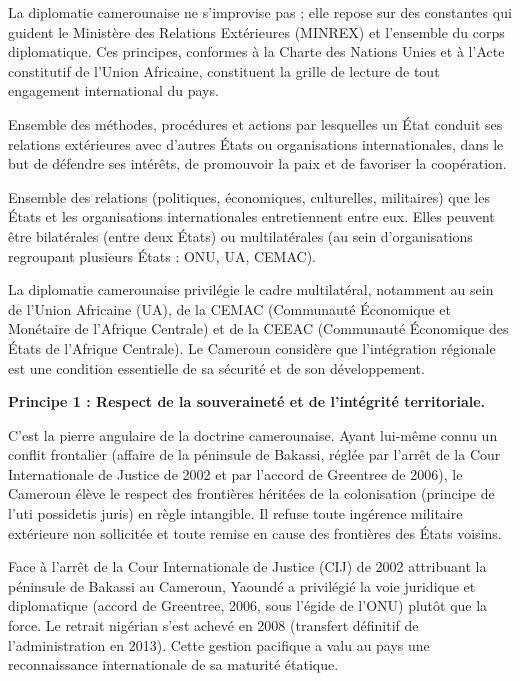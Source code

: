 \documentclass[11pt]{article}
\newcommand{\cle}[1]{{\popxbold\color{popdark}#1}}
\begin{document}
La diplomatie camerounaise ne s'improvise pas ; elle repose sur des constantes qui guident le Ministère des Relations Extérieures (MINREX) et l'ensemble du corps diplomatique. Ces principes, conformes à la Charte des Nations Unies et à l'Acte constitutif de l'Union Africaine, constituent la \cle{grille de lecture} de tout engagement international du pays.

\begin{definition}[Diplomatie]
Ensemble des méthodes, procédures et actions par lesquelles un État conduit ses relations extérieures avec d'autres États ou organisations internationales, dans le but de défendre ses intérêts, de promouvoir la paix et de favoriser la coopération.
\end{definition}

\begin{definition}
Ensemble des relations (politiques, économiques, culturelles, militaires) que les États et les organisations internationales entretiennent entre eux. Elles peuvent être \cle{bilatérales} (entre deux États) ou \cle{multilatérales} (au sein d'organisations regroupant plusieurs États : ONU, UA, CEMAC).
\end{definition}

\begin{propriete}
La diplomatie camerounaise privilégie le cadre multilatéral, notamment au sein de l'Union Africaine (UA), de la CEMAC (Communauté Économique et Monétaire de l'Afrique Centrale) et de la CEEAC (Communauté Économique des États de l'Afrique Centrale). Le Cameroun considère que l'intégration régionale est une condition essentielle de sa sécurité et de son développement.
\end{propriete}

\textbf{Principe 1 : Respect de la souveraineté et de l'intégrité territoriale.}\par
C'est la pierre angulaire de la doctrine camerounaise. Ayant lui-même connu un conflit frontalier (affaire de la péninsule de Bakassi, réglée par l'arrêt de la Cour Internationale de Justice de 2002 et par l'accord de Greentree de 2006), le Cameroun élève le respect des frontières héritées de la colonisation (principe de l'\cle{uti possidetis juris}) en règle intangible. Il refuse toute ingérence militaire extérieure non sollicitée et toute remise en cause des frontières des États voisins.

\begin{exemplebox}
Face à l'arrêt de la Cour Internationale de Justice (CIJ) de 2002 attribuant la péninsule de Bakassi au Cameroun, Yaoundé a privilégié la voie juridique et diplomatique (accord de Greentree, 2006, sous l'égide de l'ONU) plutôt que la force. Le retrait nigérian s'est achevé en 2008 (transfert définitif de l'administration en 2013). Cette gestion pacifique a valu au pays une reconnaissance internationale de sa maturité étatique.
\end{exemplebox}
\end{document}
